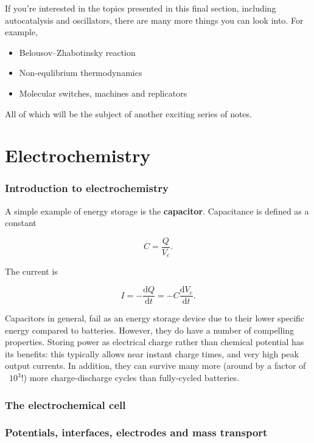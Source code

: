 \documentclass{article}
\numberwithin{theorem}{section}
\numberwithin{corollary}{section}
\numberwithin{postulate}{section}
\numberwithin{lemma}{section}
\numberwithin{definition}{section}
\begin{document}
If you're interested in the topics presented in this final section, including
autocatalysis and oscillators, there are many more things you can look into. For
example,

\begin{itemize}
  \item Belousov–Zhabotinsky reaction
  \item Non-equlibrium thermodynamics
  \item Molecular switches, machines and replicators
\end{itemize}

All of which will be the subject of another exciting series of notes.

\part{Electrochemistry}

\section{Introduction to electrochemistry}

A simple example of energy storage is the \textbf{capacitor}. Capacitance is
defined as a constant

\begin{equation}
  C = \frac{Q}{V_c}.
\end{equation}

The current is

\begin{equation}
  I = -\frac{\mathrm{d}Q}{\mathrm{d}t} = -C \frac{\mathrm{d}V_c}{\mathrm{d}t}.
\end{equation}

Capacitors in general, fail as an energy storage device due to their lower
specific energy compared to batteries. However, they do have a number of
compelling properties. Storing power as electrical charge rather than chemical
potential has its benefits: this typically allows near instant charge times, and
very high peak output currents. In addition, they can survive many more (around
by a factor of ~$10^3$!) more charge-discharge cycles than fully-cycled
batteries.

\section{The electrochemical cell}

\section{Potentials, interfaces, electrodes and mass transport}
\end{document}
